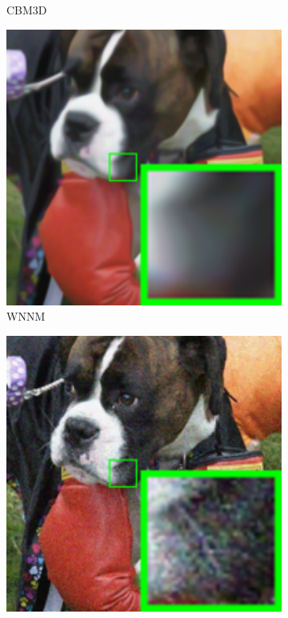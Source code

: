 \begin{figure}
\begin{subfigure}[t]{0.24\textwidth}
		\caption{CBM3D}
    \end{subfigure}
    \hfill
    \begin{subfigure}[t]{0.24\textwidth}
        \centering
        \includegraphics[width=1\textwidth]{images/twsc/nc/resize_br_WNNM_dog.png}
\caption{WNNM}
    \end{subfigure}
    \hfill
    \begin{subfigure}[t]{0.24\textwidth}
        \centering
        \includegraphics[width=1\textwidth]{images/twsc/nc/resize_br_TRD_dog.png}

\end{subfigure}
\end{figure}
